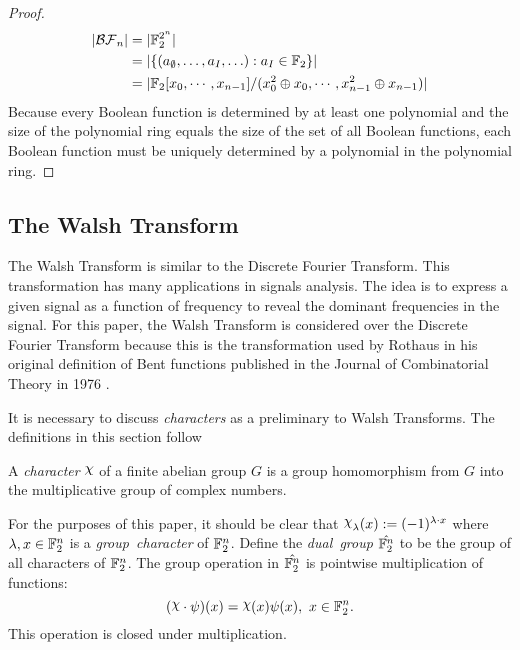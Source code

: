 \begin{proof}
  \begin{align*}
  \lvert\mathcal{BF}_n\rvert
    &= \lvert \mathbb{F}_2^{2^n} \rvert \\
    &= \lvert \{(a_{\emptyset},\ldots,a_I,\ldots):a_I\in\mathbb{F}_2\} \rvert \\
    &= \lvert \mathbb{F}_2[x_0,\cdots,x_{n-1}]/ (x_0^2\oplus x_0,\cdots,
    x_{n-1}^2 \oplus x_{n-1})\rvert
  \end{align*}
  Because every Boolean function is determined by at least one polynomial
  and the size of the polynomial ring equals the size of the set of all
  Boolean functions, each Boolean function must be uniquely determined by a
  polynomial in the polynomial ring.
\end{proof}

\subsection{The Walsh Transform}
\par The Walsh Transform is similar to the Discrete Fourier Transform.
This transformation has many applications in signals
analysis. The idea is to express a given signal as a function of frequency
to reveal the dominant frequencies in the signal. For this paper, the Walsh
Transform is considered over the Discrete Fourier Transform because this is
the transformation used by Rothaus in his original definition of Bent
functions published in the Journal of Combinatorial Theory in 1976
\cite{art:r76}. 

\par It is necessary to discuss \textit{characters} as a preliminary to Walsh
Transforms. The definitions in this section follow \cite{bk:lsy11}

\begin{definition}
  A {\em character} $\Chi$ of a finite abelian group $G$ is a group
  homomorphism from $G$ into the multiplicative group of complex numbers.
\end{definition}

For the purposes of this paper, it should be clear that
$\Chi_\lambda(x):=(-1)^{\lambda\cdot x}$ where $\lambda,x\in\mathbb{F}_2^n$ is a
{\em group\ character} of $\mathbb{F}_2^n$. Define the {\em dual\ group}
$\hat{\mathbb{F}_2^n}$ to be the group of all characters of $\mathbb{F}_2^n$. The group
operation
in $\hat{\mathbb{F}_2^n}$ is pointwise multiplication of functions:
\[
(\Chi\cdot\psi)(x)=\Chi(x)\psi(x),\ x\in\gftwo^n.
\]
This operation is closed under multiplication.

